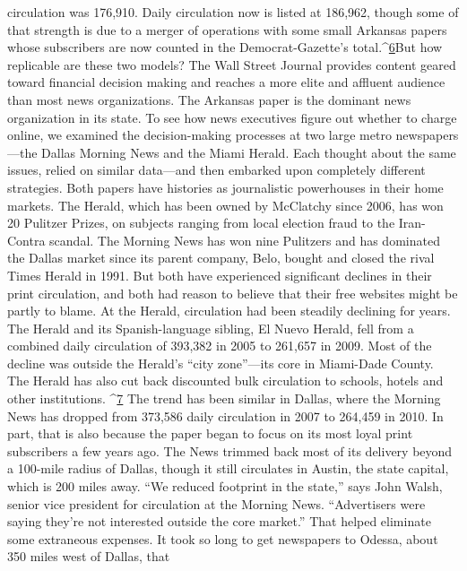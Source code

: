 circulation was 176,910. Daily circulation now is listed at 186,962, though some
of that strength is due to a merger of operations with some small Arkansas papers
whose subscribers are now counted in the Democrat-Gazette's total.^{\href{#endnotes-chapter-5}{6}}But how replicable are these two models? The Wall Street Journal provides
content geared toward financial decision making and reaches a more elite and
affluent audience than most news organizations. The Arkansas paper is the dominant
news organization in its state.
To see how news executives figure out whether to charge online, we examined
the decision-making processes at two large metro newspapers—the Dallas
Morning News and the Miami Herald. Each thought about the same issues,
relied on similar data—and then embarked upon completely different strategies.
Both papers have histories as journalistic powerhouses in their home markets.
The Herald, which has been owned by McClatchy since 2006, has won 20 Pulitzer
Prizes, on subjects ranging from local election fraud to the Iran-Contra
scandal. The Morning News has won nine Pulitzers and has dominated the Dallas
market since its parent company, Belo, bought and closed the rival Times
Herald in 1991.
But both have experienced significant declines in their print circulation, and
both had reason to believe that their free websites might be partly to blame.
At the Herald, circulation had been steadily declining for years. The Herald and
its Spanish-language sibling, El Nuevo Herald, fell from a combined daily circulation
of 393,382 in 2005 to 261,657 in 2009. Most of the decline was outside
the Herald's ``city zone''—its core in Miami-Dade County. The Herald has also
cut back discounted bulk circulation to schools, hotels and other institutions. ^{\href{#endnotes-chapter-5}{7}}%
The trend has been similar in Dallas, where the Morning News has dropped
from 373,586 daily circulation in 2007 to 264,459 in 2010. In part, that is also
because the paper began to focus on its most loyal print subscribers a few years
ago. The News trimmed back most of its delivery beyond a 100-mile radius of
Dallas, though it still circulates in Austin, the state capital, which is 200 miles
away. ``We reduced footprint in the state,'' says John Walsh, senior vice president
for circulation at the Morning News. ``Advertisers were saying they're not interested
outside the core market.'' That helped eliminate some extraneous expenses.
It took so long to get newspapers to Odessa, about 350 miles west of Dallas, that
